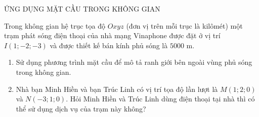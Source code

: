\begin{dang}{ỨNG DỤNG MẶT CẦU TRONG KHÔNG GIAN}

\end{dang}
\begin{bt}%
	Trong không gian hệ trục tọa độ $Oxyz$ (đơn vị trên mỗi trục là kilômét) một trạm phát sóng điện thoại của nhà mạng Vinaphone được đặt ở vị trí $I(1;-2;-3)$ và được thiết kế bán kính phủ sóng là $ 5000 $ m.
	\begin{enumerate}
		\item Sử dụng phương trình mặt cầu để mô tả ranh giới bên ngoài vùng phủ sóng trong không gian.		
		\item Nhà bạn Minh Hiền và bạn Trúc Linh có vị trí tọa độ lần lượt là $M(1;2;0)$ và $N(-3;1;0)$. Hỏi Minh Hiền và Trúc Linh dùng điện thoại tại nhà thì có thể sử dụng dịch vụ của trạm này không?
	\end{enumerate}
\end{bt}
